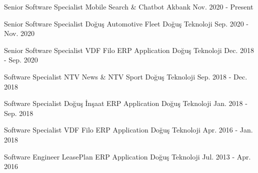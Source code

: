 

\begin{cventries}

  \cventry
    {Senior Software Specialist} %
    {Mobile Search & Chatbot} %
    {Akbank} %
    {Nov. 2020 - Present} %
    {}

  \cventry
    {Senior Software Specialist} %
    {Doğuş Automotive Fleet} %
    {Doğuş Teknoloji} %
    {Sep. 2020 - Nov. 2020} %
    {}

  \cventry
    {Senior Software Specialist} %
    {VDF Filo ERP Application} %
    {Doğuş Teknoloji} %
    {Dec. 2018 - Sep. 2020} %
    {}

  \cventry
    {Software Specialist} %
    {NTV News \& NTV Sport} %
    {Doğuş Teknoloji} %
    {Sep. 2018 - Dec. 2018} %
    {}

  \cventry
    {Software Specialist} %
    {Doğuş İnşaat ERP Application} %
    {Doğuş Teknoloji} %
    {Jan. 2018 - Sep. 2018} %
    {}

  \cventry
    {Software Specialist} %
    {VDF Filo ERP Application} %
    {Doğuş Teknoloji} %
    {Apr. 2016 - Jan. 2018} %
    {}

  \cventry
    {Software Engineer} %
    {LeasePlan ERP Application} %
    {Doğuş Teknoloji} %
    {Jul. 2013 - Apr. 2016} %
    {}

\end{cventries}
